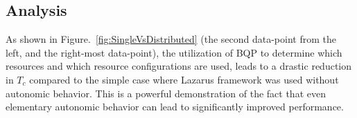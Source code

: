 \documentclass{acm_proc_article-sp}
\newcommand{\tc}{$T_c$ }
\newcommand{\jhanote}[1]{ {\textcolor{red} { ***Jha: #1 }}}
\newcommand{\yyenote}[1]{ {\textcolor{blue} { ***yye00: #1 }}}
\newcommand{\jhanote}[1]{}
\newcommand{\yyenote}[1]{}
\begin{document}
\begin{table}
\begin{center}
\vspace{0.2in}
\caption{Table showing  the selected configuration of the resources
  and the number of times a particular configuration is chosen, when 
  the decision is guided by BQP. Data in this table corresponds to
  RQA-BQP; the experiments are repeated ten times. As can be seen, 
  the use of BQP results in a varying choice of resource  configuration on  different machines.  In contrast, when BQP is not used, a fixed configuration
  is employed.}
\label{table:AllBQP}
\end{center}
\end{table}

\subsection{Analysis} 
As shown in Figure.~\ref{fig:SingleVsDistributed} (the second
data-point from the left, and the right-most data-point), the 
utilization of BQP to determine which resources and which
resource configurations are used, leads to a drastic 
reduction in \tc compared to the simple case where Lazarus
framework was used without autonomic behavior. This is 
a powerful demonstration of the fact that even elementary
autonomic behavior can lead to significantly improved 
performance.

\end{document}
